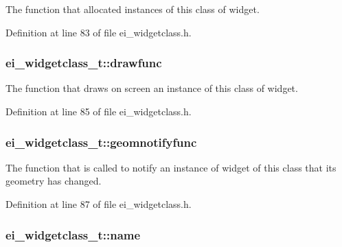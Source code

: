 The function that allocated instances of this class of widget. 



Definition at line 83 of file ei\+\_\+widgetclass.\+h.

\hypertarget{structei__widgetclass__t_a528168099a2a1515c4cf65400ccbfff2}{
\subsubsection[{drawfunc}]{ ei\+\_\+widgetclass\+\_\+t\+::drawfunc}}\label{structei__widgetclass__t_a528168099a2a1515c4cf65400ccbfff2}


The function that draws on screen an instance of this class of widget. 



Definition at line 85 of file ei\+\_\+widgetclass.\+h.

\hypertarget{structei__widgetclass__t_aaf0aa3f54a48a6b3f8b8e12574ede4b7}{
\subsubsection[{geomnotifyfunc}]{ ei\+\_\+widgetclass\+\_\+t\+::geomnotifyfunc}}\label{structei__widgetclass__t_aaf0aa3f54a48a6b3f8b8e12574ede4b7}


The function that is called to notify an instance of widget of this class that its geometry has changed. 



Definition at line 87 of file ei\+\_\+widgetclass.\+h.

\hypertarget{structei__widgetclass__t_aa5799b5999890cf04915bf0fe5151ec8}{
\subsubsection[{name}]{ ei\+\_\+widgetclass\+\_\+t\+::name}}\label{structei__widgetclass__t_aa5799b5999890cf04915bf0fe5151ec8}


